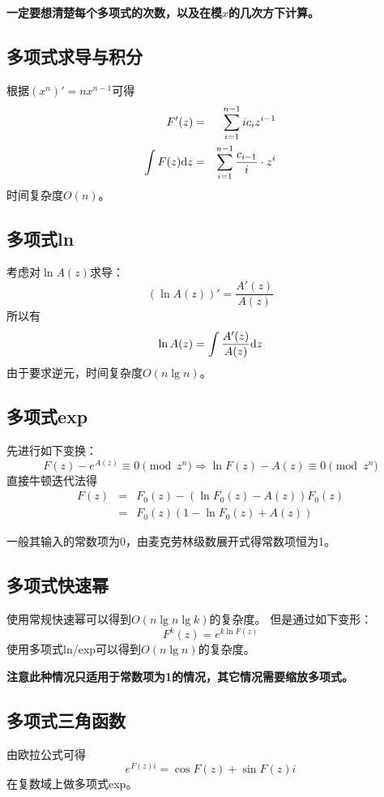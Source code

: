 {\bfseries 一定要想清楚每个多项式的次数，以及在模$x$的几次方下计算。}
\subsection{多项式求导与积分}
根据$(x^n)'=nx^{n-1}$可得
\begin{eqnarray*}
    F'(z)&=&\sum_{i=1}^{n-1}{ic_iz^{i-1}}\\
    \int F(z)\textrm{d} z&=&\sum_{i=1}^{n-1}{\frac{c_{i-1}}{i}\cdot z^i}
\end{eqnarray*}
时间复杂度$O(n)$。
\subsection{多项式ln}
考虑对$\ln A(z)$求导：
\begin{displaymath}
    (\ln A(z))'=\frac{A'(z)}{A(z)}
\end{displaymath}
所以有
\begin{displaymath}
    \ln A(z)=\int \frac{A'(z)}{A(z)}\textrm{d} z
\end{displaymath}
由于要求逆元，时间复杂度$O(n \lg n)$。
\subsection{多项式exp}
先进行如下变换：
\begin{displaymath}
    F(z)-e^{A(z)}\equiv 0 \pmod{z^n}
    \Rightarrow \ln F(z)-A(z)\equiv 0 \pmod{z^n}
\end{displaymath}
直接牛顿迭代法得
\begin{eqnarray*}
    F(z)&=&F_0(z)-(\ln F_0(z)-A(z))F_0(z)\\
    &=&F_0(z)(1-\ln F_0(z)+A(z))
\end{eqnarray*}

一般其输入的常数项为0，由麦克劳林级数展开式得常数项恒为1。
\subsection{多项式快速幂}
使用常规快速幂可以得到$O(n\lg n\lg k)$的复杂度。
但是通过如下变形：
\begin{displaymath}
    F^k(z)=e^{k \ln F(z)}
\end{displaymath}
使用多项式ln/exp可以得到$O(n\lg n)$的复杂度。

{\bfseries 注意此种情况只适用于常数项为1的情况，其它情况需要缩放多项式。}
\subsection{多项式三角函数}
由欧拉公式可得
\begin{displaymath}
    e^{F(z)i}=\cos F(z)+\sin F(z) i
\end{displaymath}
在复数域上做多项式exp。

